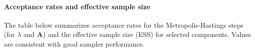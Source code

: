 \paragraph{Acceptance rates and effective sample size} The table below summarizes acceptance rates for the Metropolis-Hastings steps (for $\lambda$ and $\mathbf{A}$) and the effective sample size (ESS) for selected components. Values are consistent with good sampler performance.

